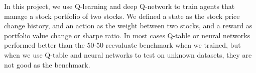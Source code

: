 
In this project, we use Q-learning and deep Q-network to train agents that manage a stock portfolio of two stocks. We defined a state as the stock price change history, and an action as the weight between two stocks, and a reward as portfolio value change or sharpe ratio. In most cases Q-table or neural networks performed better than the 50-50 reevaluate benchmark when we trained, but when we use Q-table and neural networks to test on unknown datasets, they are not good as the benchmark.	
